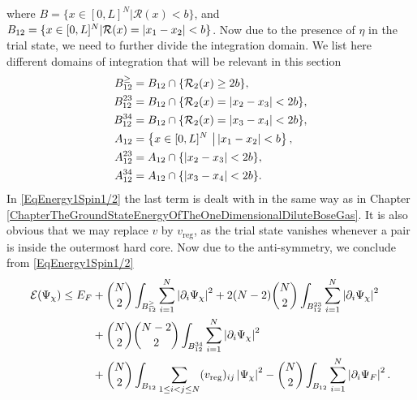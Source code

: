 where $ B=\{x\in [0,L]^N \vert \mathcal{R}(x)<b\} $, and $ B_{12}=\{x\in [0,L]^N\vert \mathcal{R}(x)=\left\lvert x_1-x_2 \right\rvert<b\} $. Now due to the presence of $ \eta $ in the trial state, we need to further divide the integration domain. We list here different domains of integration that will be relevant in this section \begin{equation}
\begin{aligned}
B^{\geq}_{12}&=B_{12}\cap \{\mathcal{R}_2(x)\geq 2b\},\\
B^{23}_{12}&=B_{12}\cap\{\mathcal{R}_2(x)=\left\lvert x_2-x_3 \right\rvert<2b\},\\
B^{34}_{12}&=B_{12}\cap\{\mathcal{R}_2(x)=\left\lvert x_3-x_4 \right\rvert<2b\},\\
A_{12}&=\left\{x\in [0,L]^N\ \big\vert \left\lvert x_1-x_2 \right\rvert<b\right\},\\
A_{12}^{23}&=A_{12}\cap \{\left\lvert x_2-x_3 \right\rvert<2b\},\\
A_{12}^{34}&=A_{12}\cap \{\left\lvert x_3-x_4 \right\rvert<2b\}.
\end{aligned}
\end{equation} 
In \eqref{EqEnergy1Spin1/2} the last term is dealt with in the same way as in Chapter \ref{ChapterTheGroundStateEnergyOfTheOneDimensionalDiluteBoseGas}. It is also obvious that we may replace $ v $ by $ v_{\text{reg}} $, as the trial state vanishes whenever a pair is inside the outermost hard core. Now due to the anti-symmetry, we conclude from \eqref{EqEnergy1Spin1/2}
\begin{equation}\label{EqEnergy2Spin1/2}
\begin{aligned}
\mathcal{E}(\Psi_{\chi})\leq E_F&+\binom{N}{2}\int_{B_{12}^{\geq}}\sum_{i=1}^{N}\left\lvert \partial_i\Psi_{\chi} \right\rvert^2+2(N-2)\binom{N}{2}\int_{B_{12}^{23}}\sum_{i=1}^{N}\left\lvert \partial_i\Psi_{\chi} \right\rvert^2\\
&+\binom{N}{2}\binom{N-2}{2}\int_{B_{12}^{34}}\sum_{i=1}^{N}\left\lvert \partial_i\Psi_{\chi} \right\rvert^2\\
&+\binom{N}{2}\int_{B_{12}}\sum_{1\leq i<j\leq N}(v_{\text{reg}})_{ij}\left\lvert \Psi_{\chi} \right\rvert^2-\binom{N}{2}\int_{B_{12}}\sum_{i=1}^{N}\left\lvert \partial_i \Psi_F \right\rvert^2.
\end{aligned}
\end{equation}
